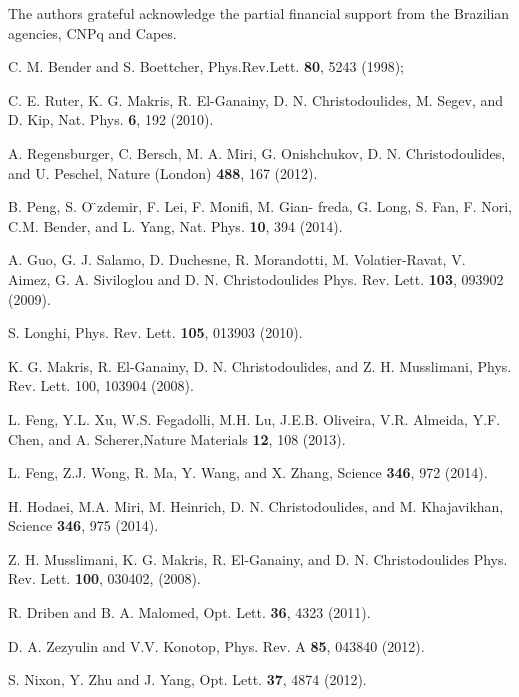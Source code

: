 \documentclass[aps,pre,showpacs,twocolumn]{revtex4}
\begin{document}
\acknowledgments
The authors grateful acknowledge the partial financial support from the Brazilian agencies, CNPq and Capes. 
\begin{thebibliography}{99}

C. M. Bender and S. Boettcher, Phys.Rev.Lett. {\bf 80}, 5243 (1998);%

 C. E. Ruter, K. G. Makris, R. El-Ganainy, D. N. Christodoulides, M. Segev, and D. Kip, Nat. Phys. {\bf 6}, 192 (2010).

  A. Regensburger, C. Bersch, M. A. Miri, G. Onishchukov, D. N. Christodoulides, and U. Peschel, Nature (London) {\bf 488}, 167
(2012).

 B. Peng, S. O ̈zdemir, F. Lei, F. Monifi, M. Gian- freda, G. Long, S. Fan, F. Nori, C.M. Bender, and L. Yang, Nat. Phys. {\bf10}, 394 (2014).

 A. Guo, G. J. Salamo, D. Duchesne, R. Morandotti, M. Volatier-Ravat, V. Aimez, G. A. Siviloglou and D. N.
Christodoulides Phys. Rev. Lett. {\bf103}, 093902 (2009). 

 S. Longhi, Phys. Rev. Lett. {\bf105}, 013903 (2010).

 K. G. Makris, R. El-Ganainy, D. N. Christodoulides, and Z. H. Musslimani, Phys. Rev. Lett. 100, 103904 (2008).

 L. Feng, Y.L. Xu, W.S. Fegadolli, M.H. Lu, J.E.B. Oliveira, V.R. Almeida, Y.F. Chen, 
and A. Scherer,Nature Materials {\bf12}, 108 (2013).

 L. Feng, Z.J. Wong, R. Ma, Y. Wang, and X. Zhang, Science {\bf346}, 972 (2014).

 H. Hodaei, M.A. Miri, M. Heinrich, D. N. Christodoulides, and M. Khajavikhan, Science {\bf346}, 975 (2014).


 Z. H. Musslimani, K. G. Makris, R. El-Ganainy, and D. N. Christodoulides
Phys. Rev. Lett. {\bf 100}, 030402, (2008).

 R. Driben and B. A. Malomed, Opt. Lett. {\bf36}, 4323 (2011).

 D. A. Zezyulin and V.V. Konotop, Phys. Rev. A {\bf85}, 043840 (2012).

 S. Nixon, Y. Zhu and J. Yang, Opt. Lett. {\bf37}, 4874 (2012).


\end{thebibliography}
\end{document}
